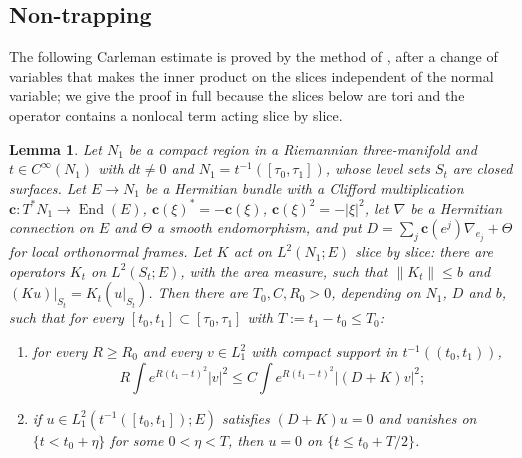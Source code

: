 \documentclass[11pt]{amsart}
\newtheorem{lemma}[theorem]{Lemma}
\theoremstyle{definition}
\theoremstyle{remark}
\theoremstyle{plain}
\numberwithin{equation}{section}
\begin{document}
\subsection{Non-trapping}

The following Carleman estimate is proved by the method of \cite[Lemmas~5 and~6]{Booss-ucp},
after a change of variables that makes the inner product on the slices independent of the
normal variable; we give the proof in full because the slices below are tori and the operator
contains a nonlocal term acting slice by slice.

\begin{lemma}\label{lem:app-carleman}
Let $N_1$ be a compact region in a Riemannian three-manifold and $t\in C^\infty(N_1)$ with
$dt\ne0$ and $N_1=t^{-1}([\tau_0,\tau_1])$, whose level sets $S_t$ are closed surfaces. Let
$E\to N_1$ be a Hermitian bundle with a Clifford multiplication
$\mathbf c\colon T^*N_1\to\operatorname{End}(E)$, $\mathbf c(\xi)^*=-\mathbf c(\xi)$,
$\mathbf c(\xi)^2=-|\xi|^2$, let $\nabla$ be a Hermitian connection on $E$ and $\Theta$ a smooth
endomorphism, and put $D=\sum_j\mathbf c(e^j)\nabla_{e_j}+\Theta$ for local orthonormal frames.
Let $K$ act on $L^2(N_1;E)$ slice by slice: there are operators $K_t$ on $L^2(S_t;E)$, with the
area measure, such that $\|K_t\|\le b$ and $(Ku)|_{S_t}=K_t(u|_{S_t})$. Then there are
$T_0,C,R_0>0$, depending on $N_1$, $D$ and $b$, such that for every
$[t_0,t_1]\subset[\tau_0,\tau_1]$ with $T:=t_1-t_0\le T_0$:
\begin{enumerate}[label=(\roman*)]
\item for every $R\ge R_0$ and every $v\in L^2_1$ with compact support in $t^{-1}((t_0,t_1))$,
  \begin{equation}\label{eq:app-carleman}
  R\int e^{R(t_1-t)^2}|v|^2\le C\int e^{R(t_1-t)^2}|(D+K)v|^2 ;
  \end{equation}
\item if $u\in L^2_1(t^{-1}([t_0,t_1]);E)$ satisfies $(D+K)u=0$ and vanishes on
  $\{t<t_0+\eta\}$ for some $0<\eta<T$, then $u=0$ on $\{t\le t_0+T/2\}$.
\end{enumerate}
\end{lemma}
\end{document}
